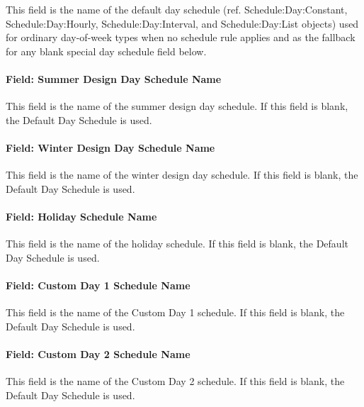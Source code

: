 This field is the name of the default day schedule (ref. Schedule:Day:Constant, Schedule:Day:Hourly, Schedule:Day:Interval, and Schedule:Day:List objects) used for ordinary day-of-week types when no schedule rule applies and as the fallback for any blank special day schedule field below.

\paragraph{Field: Summer Design Day Schedule Name}\label{field-summer-design-day-schedule-name-scheduleyearrules}

This field is the name of the summer design day schedule. If this field is blank, the Default Day Schedule is used.

\paragraph{Field: Winter Design Day Schedule Name}\label{field-winter-design-day-schedule-name-scheduleyearrules}

This field is the name of the winter design day schedule. If this field is blank, the Default Day Schedule is used.

\paragraph{Field: Holiday Schedule Name}\label{field-holiday-schedule-name-scheduleyearrules}

This field is the name of the holiday schedule. If this field is blank, the Default Day Schedule is used.

\paragraph{Field: Custom Day 1 Schedule Name}\label{field-custom-day-1-schedule-name-scheduleyearrules}

This field is the name of the Custom Day 1 schedule. If this field is blank, the Default Day Schedule is used.

\paragraph{Field: Custom Day 2 Schedule Name}\label{field-custom-day-2-schedule-name-scheduleyearrules}

This field is the name of the Custom Day 2 schedule. If this field is blank, the Default Day Schedule is used.

